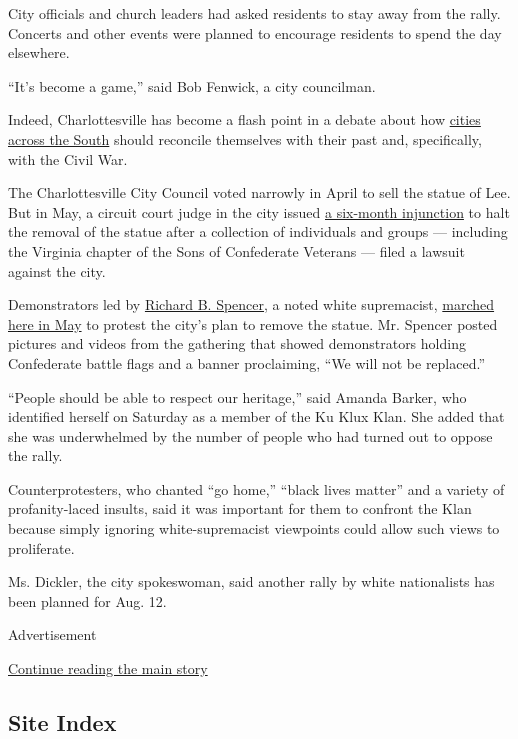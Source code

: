 City officials and church leaders had asked residents to stay away from
the rally. Concerts and other events were planned to encourage residents
to spend the day elsewhere.

``It's become a game,'' said Bob Fenwick, a city councilman.

Indeed, Charlottesville has become a flash point in a debate about how
\href{https://www.nytimes3xbfgragh.onion/2017/05/07/us/new-orleans-monuments.html}{cities
across the South} should reconcile themselves with their past and,
specifically, with the Civil War.

The Charlottesville City Council voted narrowly in April to sell the
statue of Lee. But in May, a circuit court judge in the city issued
\href{http://www.nbc29.com/story/35306157/update-judge-issues-temporary-injunction-to-halt-lee-statue-removal}{a
six-month injunction} to halt the removal of the statue after a
collection of individuals and groups --- including the Virginia chapter
of the Sons of Confederate Veterans --- filed a lawsuit against the
city.

Demonstrators led by
\href{https://www.nytimes3xbfgragh.onion/2017/01/21/us/politics/richard-spencer-punched-attack.html?_r=0}{Richard
B. Spencer}, a noted white supremacist,
\href{https://www.nytimes3xbfgragh.onion/2017/05/14/us/confederate-statue-protests-virginia.html}{marched
here in May} to protest the city's plan to remove the statue. Mr.
Spencer posted pictures and videos from the gathering that showed
demonstrators holding Confederate battle flags and a banner proclaiming,
``We will not be replaced.''

``People should be able to respect our heritage,'' said Amanda Barker,
who identified herself on Saturday as a member of the Ku Klux Klan. She
added that she was underwhelmed by the number of people who had turned
out to oppose the rally.

Counterprotesters, who chanted ``go home,'' ``black lives matter'' and a
variety of profanity-laced insults, said it was important for them to
confront the Klan because simply ignoring white-supremacist viewpoints
could allow such views to proliferate.

Ms. Dickler, the city spokeswoman, said another rally by white
nationalists has been planned for Aug. 12.

Advertisement

\protect\hyperlink{after-bottom}{Continue reading the main story}

\hypertarget{site-index}{%
\subsection{Site Index}\label{site-index}}


